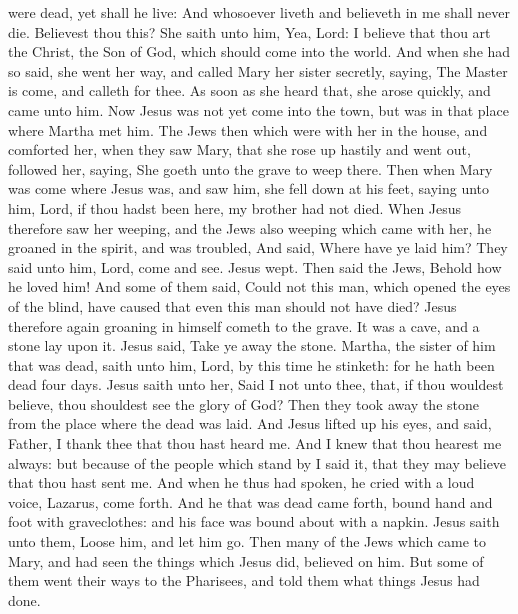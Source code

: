 were dead, yet shall he live:  And whosoever liveth and
believeth in me shall never die. Believest thou this?  She
saith unto him, Yea, Lord: I believe that thou art the Christ, the Son
of God, which should come into the world.  And when she had
so said, she went her way, and called Mary her sister secretly, saying,
The Master is come, and calleth for thee.  As soon as she
heard that, she arose quickly, and came unto him.  Now
Jesus was not yet come into the town, but was in that place where Martha
met him.  The Jews then which were with her in the house,
and comforted her, when they saw Mary, that she rose up hastily and went
out, followed her, saying, She goeth unto the grave to weep there.
 Then when Mary was come where Jesus was, and saw him, she
fell down at his feet, saying unto him, Lord, if thou hadst been here,
my brother had not died.  When Jesus therefore saw her
weeping, and the Jews also weeping which came with her, he groaned in
the spirit, and was troubled,  And said, Where have ye laid
him? They said unto him, Lord, come and see.  Jesus wept.
 Then said the Jews, Behold how he loved him! 
And some of them said, Could not this man, which opened the eyes of the
blind, have caused that even this man should not have died?
 Jesus therefore again groaning in himself cometh to the
grave. It was a cave, and a stone lay upon it.  Jesus said,
Take ye away the stone. Martha, the sister of him that was dead, saith
unto him, Lord, by this time he stinketh: for he hath been dead four
days.  Jesus saith unto her, Said I not unto thee, that, if
thou wouldest believe, thou shouldest see the glory of God?
 Then they took away the stone from the place where the
dead was laid. And Jesus lifted up his eyes, and said, Father, I thank
thee that thou hast heard me.  And I knew that thou hearest
me always: but because of the people which stand by I said it, that they
may believe that thou hast sent me.  And when he thus had
spoken, he cried with a loud voice, Lazarus, come forth. 
And he that was dead came forth, bound hand and foot with graveclothes:
and his face was bound about with a napkin. Jesus saith unto them, Loose
him, and let him go.  Then many of the Jews which came to
Mary, and had seen the things which Jesus did, believed on him.
 But some of them went their ways to the Pharisees, and
told them what things Jesus had done.

